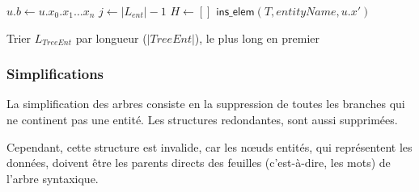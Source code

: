 \begin{algorithm}[H]
    \caption{$\textsf{ins\_ent}(T = (D, l), TreeEnt)$}
        \label{algo:struct:insent}

    $u.b \gets u.x_0.x_1 \dots x_n$\;
         
    $j \gets |L_{ent}| - 1$\;
    $H \gets []$\;
    $\textsf{ins\_elem}(T, entityName, u.x')$\;
\end{algorithm}

\begin{algorithm}[H]
    \caption{$\textsf{ins\_ent\_list}(T = (D, l), L_{TreeEnt}, L_{Rels})$}

        Trier $L_{TreeEnt}$ par longueur ($|TreeEnt|$), le plus long en premier\;




\end{algorithm}

\subsubsection{Simplifications}
La simplification des arbres consiste en la suppression de toutes les branches qui ne continent pas une entité.
Les structures redondantes, sont aussi supprimées.

Cependant, cette structure est invalide, car les nœuds entités, qui représentent les données, doivent être les parents directs des feuilles (c'est-à-dire, les mots) de l'arbre syntaxique.

